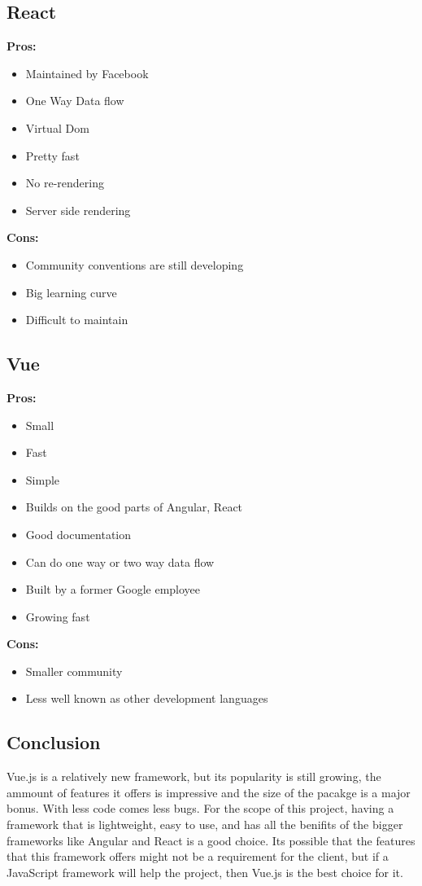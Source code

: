 \documentclass[draftclsnofoot,onecolumn,letterpaper,10pt,compsoc]{IEEEtran}
\begin{document}
	\subsection{React}
    \textbf{Pros:}
    \begin{itemize}
      \item Maintained by Facebook
      \item One Way Data flow
      \item Virtual Dom
      \item Pretty fast
      \item No re-rendering
      \item Server side rendering
    \end{itemize}

    \textbf{Cons:}
    \begin{itemize}
      \item Community conventions are still developing
      \item Big learning curve
      \item Difficult to maintain
    \end{itemize}


  \subsection{Vue}

    \textbf{Pros:}
    \begin{itemize}
      \item Small
      \item Fast
      \item Simple
      \item Builds on the good parts of Angular, React
      \item Good documentation
      \item Can do one way or two way data flow
      \item Built by a former Google employee
      \item Growing fast
    \end{itemize}

    \textbf{Cons:}
    \begin{itemize}
      \item Smaller community
      \item Less well known as other development languages
    \end{itemize}

  \subsection{Conclusion}
  Vue.js is a relatively new framework, but its popularity is still growing, the ammount of features it offers is impressive and the size of the pacakge is a major bonus.
  With less code comes less bugs.
  For the scope of this project, having a framework that is lightweight, easy to use, and has all the benifits of the bigger frameworks like Angular and React is a good choice.
  Its possible that the features that this framework offers might not be a requirement for the client, but if a JavaScript framework will help the project, then Vue.js is the best choice for it.
\end{document}
